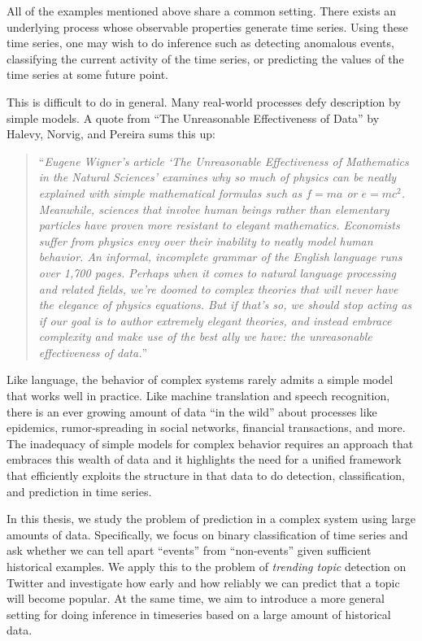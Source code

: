 All of the examples mentioned above share a common setting. There exists an
underlying process whose observable properties generate time series. Using these
time series, one may wish to do inference such as detecting anomalous events,
classifying the current activity of the time series, or predicting the values of the time series at some future point.

This is difficult to do in general. Many real-world processes defy description
by simple models. A quote from ``The Unreasonable Effectiveness of Data''
\cite{people} by Halevy, Norvig, and Pereira sums this up:
\begin{quote}
``{\em Eugene Wigner's article `The Unreasonable Effectiveness of Mathematics in
    the Natural Sciences' examines why so much of physics can be neatly
    explained with simple mathematical formulas such as $f = ma$ or $e =
    mc^2$. Meanwhile, sciences that involve human beings rather than elementary
    particles have proven more resistant to elegant mathematics. Economists
    suffer from physics envy over their inability to neatly model human
    behavior. An informal, incomplete grammar of the English language runs over
    1,700 pages. Perhaps when it comes to natural language processing and
    related fields, we're doomed to complex theories that will never have the
    elegance of physics equations. But if that's so, we should stop acting as if
    our goal is to author extremely elegant theories, and instead embrace
    complexity and make use of the best ally we have: the unreasonable
    effectiveness of data.}''
\end{quote}

Like language, the behavior of complex systems rarely admits a simple model that
works well in practice. Like machine translation and speech recognition, there
is an ever growing amount of data ``in the wild'' about processes like
epidemics, rumor-spreading in social networks, financial transactions, and
more. The inadequacy of simple models for complex behavior requires an approach
that embraces this wealth of data and it highlights the need for a unified
framework that efficiently exploits the structure in that data to do detection,
classification, and prediction in time series.

In this thesis, we study the problem of prediction in a complex system using
large amounts of data. Specifically, we focus on binary classification of time
series and ask whether we can tell apart ``events'' from ``non-events'' given
sufficient historical examples. We apply this to the problem of {\em trending
  topic} detection on Twitter and investigate how early and how reliably we can
predict that a topic will become popular. At the same time, we aim to introduce
a more general setting for doing inference in timeseries based on a large amount
of historical data.

